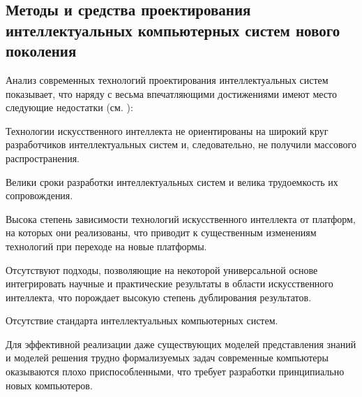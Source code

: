 
\begin{partbacktext}
\part{Методы и средства проектирования интеллектуальных компьютерных систем нового поколения}
\noindent
Анализ современных технологий проектирования интеллектуальных систем показывает, что
наряду с весьма впечатляющими достижениями имеют место следующие недостатки (см. ):
\begin{textitemize}
	\item{Технологии искусственного интеллекта не ориентированы на широкий круг разработчиков
	интеллектуальных систем и, следовательно, не получили массового распространения.}
	\item{Велики сроки разработки интеллектуальных систем и велика трудоемкость их
		сопровождения.}
	\item{Высока степень зависимости технологий искусственного интеллекта от платформ, на которых
		они реализованы, что приводит к существенным изменениям технологий при переходе на
		новые платформы.}
	\item{Отсутствуют подходы, позволяющие на некоторой универсальной основе интегрировать
		научные и практические результаты в области искусственного интеллекта, что порождает
		высокую степень дублирования результатов.}
	\item{Отсутствие стандарта интеллектуальных компьютерных систем.}
	\item{Для эффективной реализации даже существующих моделей представления знаний и моделей
		решения трудно формализуемых задач современные компьютеры оказываются плохо
		приспособленными, что требует разработки принципиально новых компьютеров.}
\end{textitemize}


\end{partbacktext}
